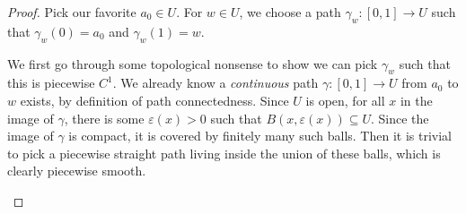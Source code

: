 \documentclass[a4paper]{article}
\begin{document}
\begin{proof}
  Pick our favorite $a_0 \in U$. For $w \in U$, we choose a path $\gamma_w: [0, 1] \to U$ such that $\gamma_w(0) = a_0$ and $\gamma_w(1) = w$.

  We first go through some topological nonsense to show we can pick $\gamma_w$ such that this is piecewise $C^1$. We already know a \emph{continuous} path $\gamma: [0, 1] \to U$ from $a_0$ to $w$ exists, by definition of path connectedness. Since $U$ is open, for all $x$ in the image of $\gamma$, there is some $\varepsilon(x) > 0$ such that $B(x, \varepsilon(x)) \subseteq U$. Since the image of $\gamma$ is compact, it is covered by finitely many such balls. Then it is trivial to pick a piecewise straight path living inside the union of these balls, which is clearly piecewise smooth.
  \begin{center}
\end{center}
\end{proof}
\end{document}
